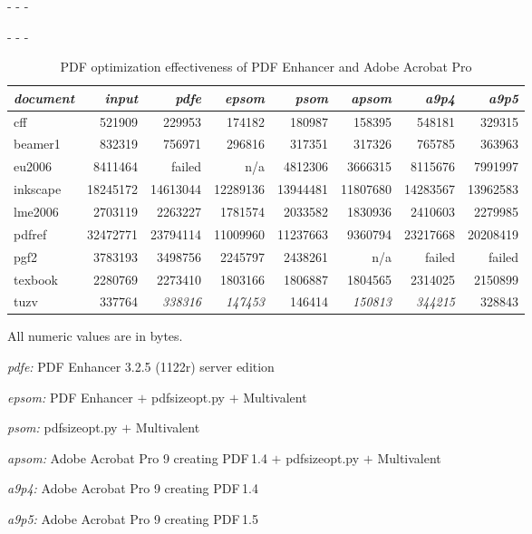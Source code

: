 \documentclass{ltugproc}
\def\cmd{\textsf}
\def\captiontop#1{%
  \advance\abovecaptionskip-\belowcaptionskip
  \advance\belowcaptionskip\abovecaptionskip
  \advance\abovecaptionskip-\belowcaptionskip
  \abovecaptionskip-\abovecaptionskip
  \caption{#1}%
  \advance\abovecaptionskip-\belowcaptionskip
  \advance\belowcaptionskip\abovecaptionskip
  \advance\abovecaptionskip-\belowcaptionskip
  \abovecaptionskip-\abovecaptionskip
}
\begin{document}
\begin{table*}
\captiontop{PDF optimization effectiveness
of PDF Enhancer and Adobe Acrobat Pro}\label{tab:eff-pdfe-a9}
\par\small\noindent\hfil
\advance\tabcolsep-2pt  %
\begin{tabular*}{\hsize}{@{\extracolsep{\fill}}lrrrrrrr@{}}
\toprule
\emph{document} & \emph{input} & \emph{pdfe} & \emph{epsom} & \emph{psom} & \emph{apsom} & \emph{a9p4} & \emph{a9p5} \\\midrule
cff         &   521909 &   229953 &   174182 &   180987 &   158395 &   548181 &   329315\\
beamer1     &   832319 &   756971 &   296816 &   317351 &   317326 &   765785 &   363963\\
eu2006      &  8411464 &  failed  & n/a      &  4812306 &  3666315 &  8115676 &  7991997\\
inkscape    & 18245172 & 14613044 & 12289136 & 13944481 & 11807680 & 14283567 & 13962583\\
lme2006     &  2703119 &  2263227 &  1781574 &  2033582 &  1830936 &  2410603 &  2279985\\
pdfref      & 32472771 & 23794114 & 11009960 & 11237663 &  9360794 & 23217668 & 20208419\\
pgf2        &  3783193 &  3498756 &  2245797 &  2438261 & n/a      &   failed &   failed\\
texbook     &  2280769 &  2273410 &  1803166 &  1806887 &  1804565 &  2314025 &  2150899\\
tuzv        &   337764 &  \emph{338316} &   \emph{147453} & 146414 & \emph{150813} &  \emph{344215} &   328843 \\
\bottomrule
\end{tabular*}
\par\bigskip
\par\noindent All numeric values are in bytes.
\par\noindent\emph{pdfe:} PDF Enhancer 3.2.5 (1122r) server edition
\par\noindent\emph{epsom:} PDF Enhancer $+$ \cmd{pdfsizeopt.py} $+$ Multivalent
\par\noindent\emph{psom:} \cmd{pdfsizeopt.py} $+$ Multivalent
\par\noindent\emph{apsom:} Adobe Acrobat Pro 9 creating PDF\,1.4 $+$ \cmd{pdfsizeopt.py} $+$ Multivalent
\par\noindent\emph{a9p4:} Adobe Acrobat Pro 9 creating PDF\,1.4
\par\noindent\emph{a9p5:} Adobe Acrobat Pro 9 creating PDF\,1.5
\end{table*}
\end{document}
